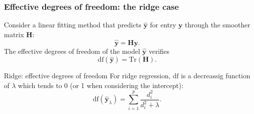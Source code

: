 \documentclass[10pt, c, xcolor=x11names]{beamer}\usepackage[]{graphicx}\usepackage[]{color}
\begin{document}
\begin{frame}
  \frametitle{Effective degrees of freedom: the ridge case}

  \begin{proposition} Consider a linear fitting method that predicts
    $\hat{\mathbf{y}}$  for  entry  $\mathbf{y}$  through  the
    smoother matrix $\mathbf{H}$:
    \begin{equation*}
      \hat{\mathbf{y}} = \mathbf{H} \mathbf{y}.
    \end{equation*}
    The    effective    degrees    of    freedom    of    the    model
    $\hat{\mathbf{y}}$ verifies
    \begin{equation*}
      \mathrm{df}(\hat{\mathbf{y}}) = \mathrm{Tr}(\mathbf{H}).
    \end{equation*}
  \end{proposition}

  \vfill

  \begin{block}{Ridge: effective degrees of freedom}
    For ridge  regression, $\mathrm{df}$  is a decreassig  function of
    $\lambda$ which tends to 0 (or 1 when considering the intercept):
    \begin{equation*}
      \mathrm{df}(\hat{\mathbf{y}}_\lambda) =\sum_{i=1}^p \frac{d_i^2}{d_i^2+\lambda}.
    \end{equation*}
  \end{block}


\end{frame}
 
\end{document}
